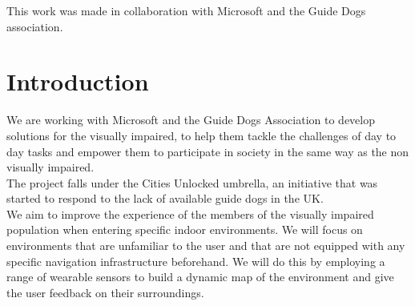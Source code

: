 \documentclass[prodmode,acmtecs]{acmsmall} %
\begin{document}


\begin{bottomstuff}
This work was made in collaboration with Microsoft and the Guide Dogs association.
\end{bottomstuff}

\maketitle

\section{Introduction}
We are working with Microsoft and the Guide Dogs Association to develop solutions for the visually impaired, to help them tackle the challenges of day to day tasks and empower them to participate in society in the same way as the non visually impaired.\\
The project falls under the Cities Unlocked 
umbrella, an initiative that was started to respond to the lack of available guide dogs in the UK.\\
We aim to improve the experience of the members of the visually impaired population when entering specific indoor environments.
We will focus on environments that are unfamiliar to the user and that are not equipped with any specific navigation infrastructure beforehand.
We will do this by employing a range of wearable  sensors to build a dynamic map of the environment and give the user feedback on their surroundings.
\end{document}

